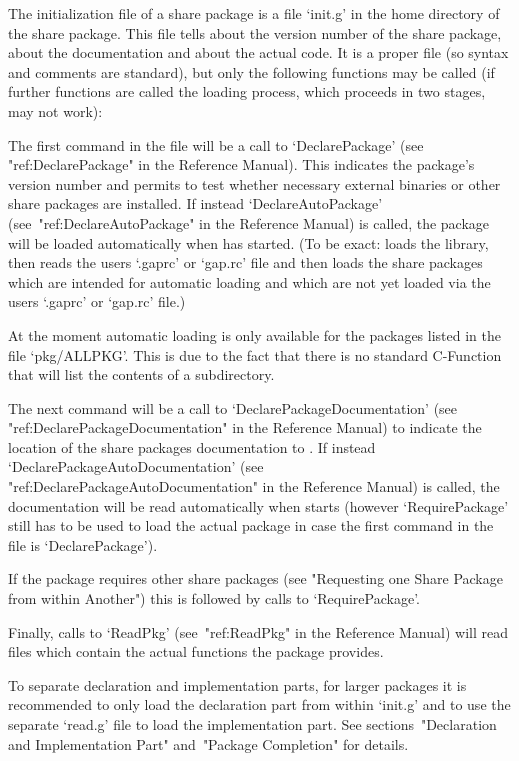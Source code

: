 
The initialization file of a share package is a file `init.g' in the
home directory of the share package. This file tells {\GAP} about the
version number of the share package, about the documentation and about
the actual code. It is a proper {\GAP} file (so syntax and comments
are standard), but only the following {\GAP} functions may be called
(if further functions are called the loading process, which proceeds
in two stages, may not work):

The first command in the file will be a call to `DeclarePackage' (see
"ref:DeclarePackage" in the Reference Manual). This indicates the package's
version number and permits to test whether necessary external binaries or
other share packages are installed. If instead `DeclareAutoPackage'
(see~"ref:DeclareAutoPackage" in the Reference Manual) is called, the
package will be loaded automatically when {\GAP} has started. (To be exact:
{\GAP} loads the library, then reads the users `.gaprc' or `gap.rc' file
and then loads the share packages which are intended for automatic loading
and which are not yet loaded via the users `.gaprc' or `gap.rc' file.)

At the moment automatic loading is only available for the packages listed
in the file `pkg/ALLPKG'. This is due to the fact that there is no standard
C-Function that will list the contents of a subdirectory.

The next command will be a call to `DeclarePackageDocumentation' (see
"ref:DeclarePackageDocumentation" in the Reference Manual) to indicate the
location of the share packages documentation to {\GAP}. If instead
`DeclarePackageAutoDocumentation' (see "ref:DeclarePackageAutoDocumentation"
in the Reference Manual) is called, the documentation will be read
automatically when {\GAP} starts (however `RequirePackage' still has to be
used to load the actual package in case the first command in the file is
`DeclarePackage').

If the package requires other share packages (see "Requesting one Share
Package from within Another") this is followed by calls to `RequirePackage'.

Finally, calls to `ReadPkg' (see~"ref:ReadPkg" in the Reference Manual)
will read files which contain the actual {\GAP}
functions the package provides.

To separate declaration and implementation parts, for larger packages it is
recommended to only load the declaration part from within `init.g' and to
use the separate `read.g' file to load the implementation part.
See sections~"Declaration and Implementation Part" and~"Package Completion"
for details.

